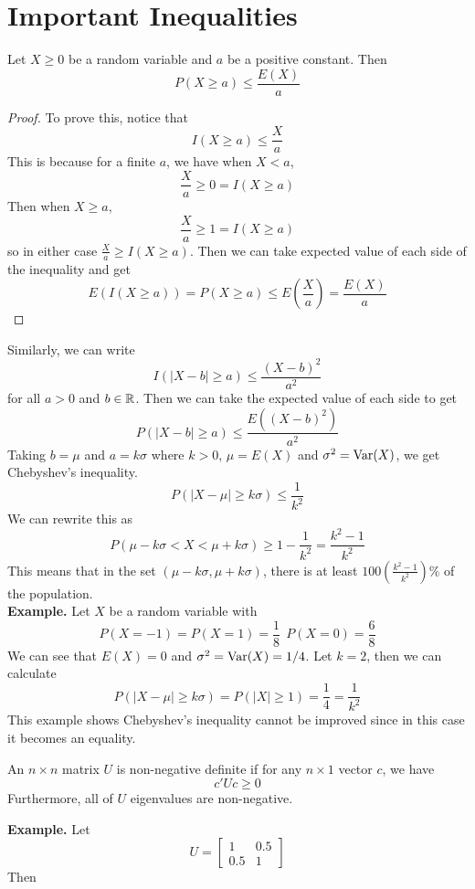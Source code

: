 \documentclass[openany]{report}
\begin{document}
\section{Important Inequalities}
\begin{theorem}
    Let $X \geq 0$ be a random variable and $a$ be a positive constant. Then 
    \[P(X \geq a) \leq \frac{E(X)}{a}\]
\end{theorem}
\begin{proof}
    To prove this, notice that 
    \[I(X \geq a) \leq \frac{X}{a}\]
    This is because for a finite $a$, we have when $X < a$,
    \[\frac{X}{a} \geq 0 = I(X \geq a)\]
    Then when $X \geq a$,
    \[\frac{X}{a} \geq 1 = I(X \geq a)\]
    so in either case $\frac{X}{a} \geq I(X \geq a)$. Then we can take expected value of each side of the inequality and get 
    \[E(I(X \geq a)) = P(X \geq a) \leq E\left(\frac{X}{a}\right) = \frac{E(X)}{a} \] 
\end{proof}
Similarly, we can write 
\[I(|X-b|\geq a) \leq \frac{(X-b)^2}{a^2}\]
for all $a > 0$ and $b \in \mathbb{R}$. Then we can take the expected value of each side to get
\[P(|X-b| \geq a) \leq \frac{E((X-b)^2)}{a^2}\]
Taking $b = \mu$ and $a = k\sigma$ where $k > 0$, $\mu = E(X)$ and $\sigma^2 = \operatorname{Var}(X)$, we get Chebyshev's inequality.
\[P(|X - \mu| \geq k\sigma) \leq \frac{1}{k^2} \]
We can rewrite this as 
\[P(\mu - k\sigma < X < \mu + k\sigma) \geq 1 - \frac{1}{k^2} = \frac{k^2-1}{k^2}\]
This means that in the set $(\mu - k\sigma, \mu +k\sigma)$, there is at least $100\left(\frac{k^2-1}{k^2}\right)\%$ of the population.\\[2ex]
\textbf{Example.} Let $X$ be a random variable with
\[P(X = -1) = P(X = 1) = \frac{1}{8} \ \ P(X = 0) = \frac{6}{8}\]
We can see that $E(X) = 0$ and $\sigma^2 = \operatorname{Var}(X) = 1/4$. Let $k = 2$, then we can calculate
\[P(|X - \mu| \geq k\sigma) = P(|X| \geq 1) = \frac{1}{4}= \frac{1}{k^2}\]
This example shows Chebyshev's inequality cannot be improved since in this case it becomes an equality.
\begin{definition}
    An $n \times n$ matrix $U$ is non-negative definite if for any $n \times 1$ vector $c$, we have
    \[c'Uc \geq 0\]
    Furthermore, all of $U$ eigenvalues are non-negative.
\end{definition}
\noindent
\textbf{Example.}
Let 
\[U = \begin{bmatrix}
    1 & 0.5 \\
    0.5 & 1
\end{bmatrix}\]
Then 
\end{document}
